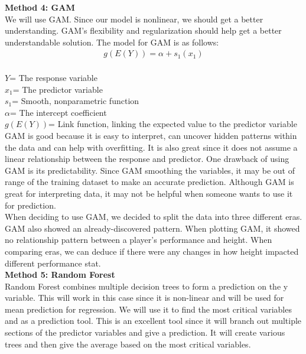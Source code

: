 \documentclass[11pt,letterpaper]{amsart}
\begin{document}
\noindent \large \textbf{Method 4: GAM}\\
\indent We will use GAM. Since our model is nonlinear, we should get a better understanding. GAM’s flexibility and regularization should help get a better understandable solution. The model for GAM is as follows:
\begin{align*}
g(E(Y))= \alpha + s_1(x_1)
\end{align*}\\
\textbf{$Y$}= The response variable\\
\textbf{$x_1$}= The predictor variable\\
\textbf{$s_1$}= Smooth, nonparametric function\\
\textbf{$\alpha$}= The intercept coefficient\\
\textbf{$g(E(Y))$}= Link function, linking the expected value to the predictor variable\\
\cite{7} \leavevmode \newline
\indent GAM is good because it is easy to interpret, can uncover hidden patterns within the data and can help with overfitting. It is also great since it does not assume a linear relationship between the response and predictor. One drawback of using GAM is its predictability. Since GAM smoothing the variables, it may be out of range of the training dataset to make an accurate prediction. Although GAM is great for interpreting data, it may not be helpful when someone wants to use it for prediction.\\
\indent When deciding to use GAM, we decided to split the data into three different eras. GAM also showed an already-discovered pattern. When plotting GAM, it showed no relationship pattern between a player's performance and height. When comparing eras, we can deduce if there were any changes in how height impacted different performance stat.\\

\noindent \large \textbf{Method 5: Random Forest}\\
\indent Random Forest combines multiple decision trees to form a prediction on the y variable. This will work in this case since it is non-linear and will be used for mean prediction for regression. We will use it to find the most critical variables and as a prediction tool. This is an excellent tool since it will branch out multiple sections of the predictor variables and give a prediction. It will create various trees and then give the average based on the most critical variables.
\end{document}
